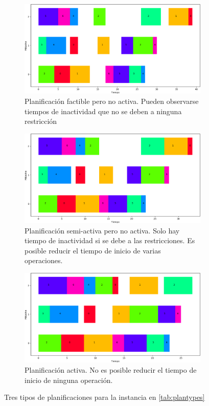\begin{figure}[ht]
    \centering
    \begin{subfigure}{.8\textwidth}
        \centering
        \includegraphics[scale = .45]{Imagenes/ganttfeas.png}
        \caption{Planificación factible pero no activa. Pueden observarse tiempos de inactividad que no se deben a ninguna restricción}
    \end{subfigure}
    \begin{subfigure}{.8\textwidth}
        \centering
        \includegraphics[scale = .45]{Imagenes/ganttsemi.png}
        \caption{Planificación semi-activa pero no activa. Solo hay tiempo de inactividad si se debe a las restricciones. Es posible reducir el tiempo de inicio de varias operaciones.}
    \end{subfigure}
    \begin{subfigure}{.8\textwidth}
        \centering
        \includegraphics[scale = .45]{Imagenes/ganttactive.png}
        \caption{Planificación activa. No es posible reducir el tiempo de inicio de ninguna operación.} 
    \end{subfigure}
    \caption{Tres tipos de planificaciones para la instancia en \ref{tab:plantypes}}
        \label{fig:plantypes}
\end{figure}

